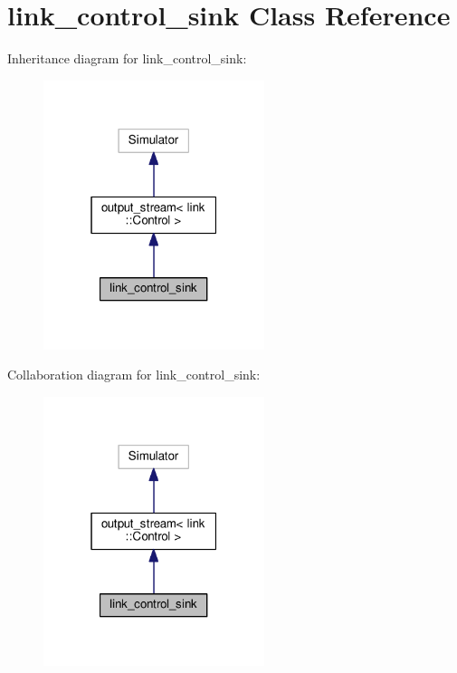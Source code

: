 \hypertarget{classlink__control__sink}{}\section{link\+\_\+control\+\_\+sink Class Reference}
\label{classlink__control__sink}


Inheritance diagram for link\+\_\+control\+\_\+sink\+:
\nopagebreak
\begin{figure}[H]
\begin{center}
\leavevmode
\includegraphics[width=183pt]{classlink__control__sink__inherit__graph}
\end{center}
\end{figure}


Collaboration diagram for link\+\_\+control\+\_\+sink\+:
\nopagebreak
\begin{figure}[H]
\begin{center}
\leavevmode
\includegraphics[width=183pt]{classlink__control__sink__coll__graph}
\end{center}
\end{figure}

